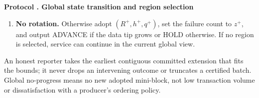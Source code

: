 \documentclass[11pt,a4paper,onecolumn]{article}
\newcommand{\gv}{v_{\mathrm G}}
\newcommand{\Tag}[1]{\mathsf{#1}}
\theoremstyle{remark}\newtheorem{example}[definition]{Example}
\newcounter{protocol}
\newenvironment{protocol}[2]{\refstepcounter{protocol}\label{#1}\begin{mdframed}[nobreak=true,linewidth=.6pt,skipabove=10pt,skipbelow=10pt,innertopmargin=8pt,innerbottommargin=8pt]\small\raggedright\noindent\textbf{Protocol \theprotocol. #2}\par\smallskip}{\end{mdframed}}
\begin{document}
\begin{protocol}{alg:gtransition}{Global state transition and region selection}
\begin{enumerate}[label=\textbf{T\arabic*.}]
Set $\mathsf{reason}=\Tag{RECOVERY}$ if $z^+\geq K_G$ and
$\Tag{PLANNED}$ otherwise, giving recovery precedence when both guards hold.
The successor starts with $u=1,v=0$ and its configured first primary. ROTATE does not
simultaneously adopt a new range: its readiness proof refers to the retained tip.
The proposed regional extension remains a preview. Selection of $j=i$ uses
the same finality and activation rules, with a fresh global view $\gv+1$ and $R_0$;
it does not reuse old instance identifiers or erase signing history.
\item \textbf{No rotation.} Otherwise adopt $(R^+,h^+,q^+)$, set the failure
count to $z^+$, and output ADVANCE if the data tip grows or HOLD otherwise.
If no region is selected, service can continue in the current global view.
\end{enumerate}
\end{protocol}

An honest reporter takes the earliest contiguous committed extension that fits
the bounds; it never drops an intervening outcome or truncates a certified batch.
Global no-progress means no new adopted mini-block, not low transaction volume
or dissatisfaction with a producer's ordering policy.
\end{document}
